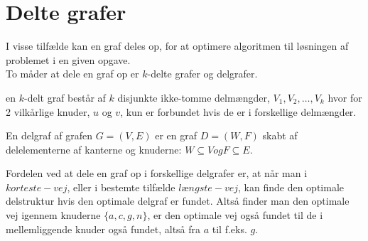 \section{Delte grafer}
I visse tilfælde kan en graf deles op, for at optimere algoritmen til løsningen af problemet i en given opgave. \\
To måder at dele en graf op er $k$-delte grafer og delgrafer.

\begin{defn} \label{defn:k-delt} %
en $k$-delt graf består af $k$ disjunkte ikke-tomme delmængder, $V_1, V_2, \ldots, V_k$ hvor for 2 vilkårlige knuder, $u$ og $v$, kun er forbundet hvis de er i forskellige delmængder.
\end{defn}
\begin{defn}	 \label{defn:delgraf} %
En delgraf af grafen $G= (V,E)$ er en graf $D = (W,F)$ skabt af delelementerne af kanterne og knuderne: $W \subseteq V og F \subseteq E$.
\end{defn}

Fordelen ved at dele en graf op i forskellige delgrafer er, at når man i $korteste-vej$, eller i bestemte tilfælde $længste-vej$, kan finde den optimale delstruktur hvis den optimale delgraf er fundet. Altså finder man den optimale vej igennem knuderne $\{a, c, g, n\}$, er den optimale vej også fundet til de i mellemliggende knuder også fundet, altså fra $a$ til f.eks. $g$.